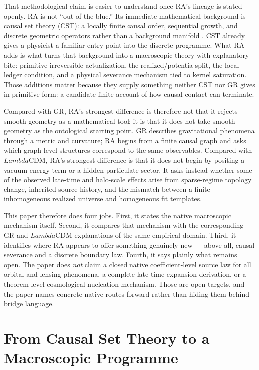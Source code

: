 \documentclass[11pt]{article}
\def\Lambda{Lambda}%
\begin{document}
That methodological claim is easier to understand once RA's lineage is stated openly. RA is not ``out of the blue.'' Its immediate mathematical background is causal set theory (CST): a locally finite causal order, sequential growth, and discrete geometric operators rather than a background manifold \cite{Bombelli1987,Sorkin1997,Rideout2000,Benincasa2010,Dowker2013}. CST already gives a physicist a familiar entry point into the discrete programme. What RA adds is what turns that background into a macroscopic theory with explanatory bite: primitive irreversible actualization, the realized/potentia split, the local ledger condition, and a physical severance mechanism tied to kernel saturation. Those additions matter because they supply something neither CST nor GR gives in primitive form: a candidate finite account of how causal contact can terminate.

Compared with GR, RA's strongest difference is therefore not that it rejects smooth geometry as a mathematical tool; it is that it does not take smooth geometry as the ontological starting point. GR describes gravitational phenomena through a metric and curvature; RA begins from a finite causal graph and asks which graph-level structures correspond to the same observables. Compared with $\Lambda$CDM, RA's strongest difference is that it does not begin by positing a vacuum-energy term or a hidden particulate sector. It asks instead whether some of the observed late-time and halo-scale effects arise from sparse-regime topology change, inherited source history, and the mismatch between a finite inhomogeneous realized universe and homogeneous fit templates.

This paper therefore does four jobs. First, it states the native macroscopic mechanism itself. Second, it compares that mechanism with the corresponding GR and $\Lambda$CDM explanations of the same empirical domain. Third, it identifies where RA appears to offer something genuinely new --- above all, causal severance and a discrete boundary law. Fourth, it says plainly what remains open. The paper does \emph{not} claim a closed native coefficient-level source law for all orbital and lensing phenomena, a complete late-time expansion derivation, or a theorem-level cosmological nucleation mechanism. Those are open targets, and the paper names concrete native routes forward rather than hiding them behind bridge language.

\section{From Causal Set Theory to a Macroscopic Programme}
\end{document}

